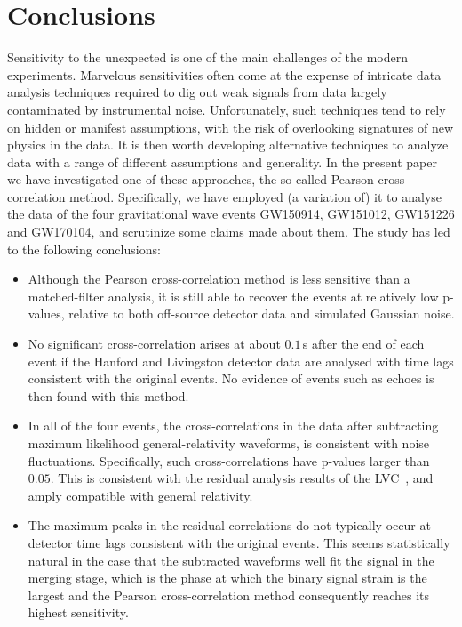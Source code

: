 \documentclass[a4paper,11pt]{article}
\begin{document}
\section{Conclusions}
\label{sec:conclusions}
Sensitivity to the unexpected is one of the main challenges of the modern experiments. Marvelous sensitivities often come at the expense of intricate data analysis techniques required to dig out weak signals from data largely contaminated by instrumental noise. Unfortunately, such techniques tend to rely on hidden or manifest assumptions, with the risk of overlooking signatures of new physics in the data. It is then worth developing alternative techniques to analyze data with a range of different assumptions and generality. In the present paper we have investigated one of these approaches, the so called Pearson cross-correlation method. Specifically, we have employed (a variation of) it to analyse the data of the four gravitational wave events GW150914, GW151012, GW151226 and GW170104, and scrutinize some claims made about them. The study has led to the following conclusions:
%
\begin{itemize}
\item 
Although the Pearson cross-correlation method is less sensitive than a matched-filter analysis, it is still able to recover the events at relatively low p-values, relative to both off-source detector data and simulated Gaussian noise. 
%
\item No significant cross-correlation arises at about $0.1$\,s after the end of each event if the Hanford and Livingston detector data are analysed with time lags consistent with the original events. No evidence of events such as echoes is then found with this method.
%
\item In all of the four events, the cross-correlations in the data after subtracting maximum likelihood general-relativity waveforms, is consistent with noise fluctuations. Specifically, such cross-correlations have p-values larger than $0.05$. This is consistent with the residual analysis results of the LVC~\cite{LIGOScientific:2019fpa}, and amply compatible with general relativity. 
%
\item The maximum peaks in the residual correlations do not typically occur at detector time lags consistent with the original events. This seems statistically natural in the case that the subtracted waveforms well fit the signal in the merging stage, which is the phase at which the binary signal strain is the largest and the Pearson cross-correlation method consequently reaches its highest sensitivity.
\end{itemize}
\end{document}
